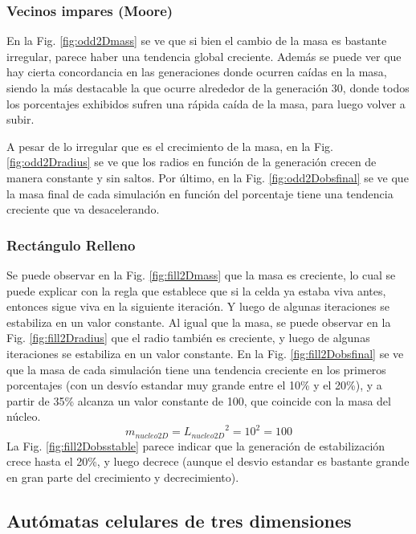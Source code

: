 \subsubsection{Vecinos impares (Moore)}
En la Fig. \ref{fig:odd2Dmass} se ve que si bien el cambio de la masa es bastante irregular, parece haber una tendencia global creciente.
Además se puede ver que hay cierta concordancia en las generaciones donde ocurren caídas en la masa, siendo la más destacable la que ocurre alrededor de la generación 30, donde todos los porcentajes exhibidos sufren una rápida caída de la masa, para luego volver a subir.

A pesar de lo irregular que es el crecimiento de la masa, en la Fig. \ref{fig:odd2Dradius} se ve que los radios en función de la generación crecen de manera constante y sin saltos.
Por último, en la Fig. \ref{fig:odd2Dobsfinal} se ve que la masa final de cada simulación en función del porcentaje tiene una tendencia creciente que va desacelerando.

\subsubsection{Rectángulo Relleno}
Se puede observar en la Fig. \ref{fig:fill2Dmass} que la masa es creciente, lo cual se puede explicar con la regla que establece que si la celda ya estaba viva antes, entonces sigue viva en la siguiente iteración.
Y luego de algunas iteraciones se estabiliza en un valor constante.
Al igual que la masa, se puede observar en la Fig. \ref{fig:fill2Dradius} que el radio también es creciente, y luego de algunas iteraciones se estabiliza en un valor constante.
En la Fig. \ref{fig:fill2Dobsfinal} se ve que la masa de cada simulación tiene una tendencia creciente en los primeros porcentajes (con un desvío estandar muy grande entre el 10\% y el 20\%), y a partir de 35\% alcanza un valor constante de 100,
que coincide con la masa del núcleo.
\begin{equation}
    m_{nucleo2D} = {L_{nucleo2D}}^2 = 10^2 = 100
\end{equation}
La Fig. \ref{fig:fill2Dobsstable} parece indicar que la generación de estabilización crece hasta el 20\%, y luego decrece (aunque el desvio estandar es bastante grande en gran parte del crecimiento y decrecimiento).


\subsection{Autómatas celulares de tres dimensiones}
\label{subsec:results3d}

